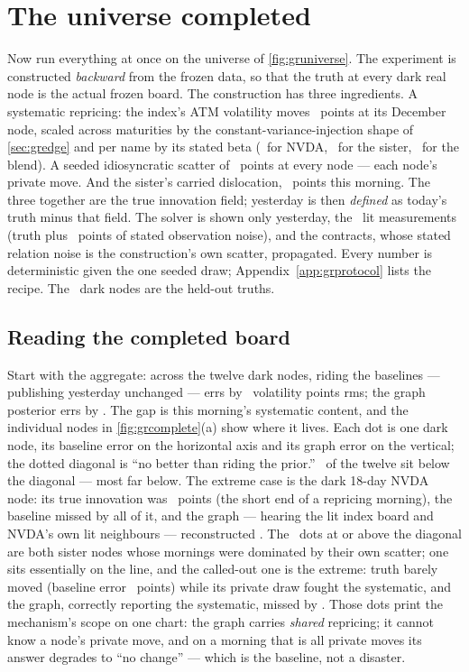 \section{The universe completed}
\label{sec:grcomplete}

Now run everything at once on the universe of
\cref{fig:gruniverse}.  The experiment is constructed \emph{backward}
from the frozen data, so that the truth at every dark real node is the
actual frozen board.  The construction has three ingredients.  A
systematic repricing: the index's ATM volatility moves
\MacGrAnchorMovePts\ points at its December node, scaled across
maturities by the constant-variance-injection shape of
\cref{sec:gredge} and per name by its stated beta (\MacGrBetaNvda\
for NVDA, \MacGrBetaSister\ for the sister, \MacGrBetaBlend\ for the
blend).  A seeded idiosyncratic scatter of \MacGrScatterSd\ points at
every node --- each node's private move.  And the sister's carried
dislocation, \MacGrSisterCarried\ points this morning.  The three
together are the true innovation field; yesterday is then
\emph{defined} as today's truth minus that field.  The solver is
shown only yesterday, the \MacGrLitCount\ lit measurements (truth
plus \MacGrObsSd\ points of stated observation noise), and the
contracts, whose stated relation noise is the construction's own
scatter, propagated.  Every number is deterministic given the one
seeded draw; Appendix~\ref{app:grprotocol} lists the recipe.  The
\MacGrDarkCount\ dark nodes are the held-out truths.

\subsection{Reading the completed board}

Start with the aggregate: across the twelve dark nodes, riding the
baselines --- publishing yesterday unchanged --- errs by
\MacGrRmsBase\ volatility points rms; the graph posterior errs by
\MacGrRmsGraph.  The gap is this morning's systematic content, and the
individual nodes in \cref{fig:grcomplete}(a) show where it lives.
Each dot is one dark node, its baseline error on the horizontal axis
and its graph error on the vertical; the dotted diagonal is ``no
better than riding the prior.''  \MacGrSkillBetter\ of the twelve sit
below the diagonal --- most far below.  The extreme case is the dark
18-day NVDA node: its true innovation was \MacGrShortDarkTrue\ points
(the short end of a repricing morning), the baseline missed by all of
it, and the graph --- hearing the lit index board and NVDA's own lit
neighbours --- reconstructed \MacGrShortDarkPost.  The
\MacGrSkillWorse\ dots at or above the diagonal are both sister
nodes whose mornings were dominated by their own scatter; one sits
essentially on the line, and the called-out one is the extreme:
truth barely moved (baseline error
\MacGrCalmBase\ points) while its private draw fought the systematic,
and the graph, correctly reporting the systematic, missed by
\MacGrCalmGraph.  Those dots print the mechanism's scope
on one chart: the graph carries \emph{shared} repricing; it cannot
know a node's private move, and on a morning that is all
private moves its answer degrades to ``no change'' --- which is
the baseline, not a disaster.

